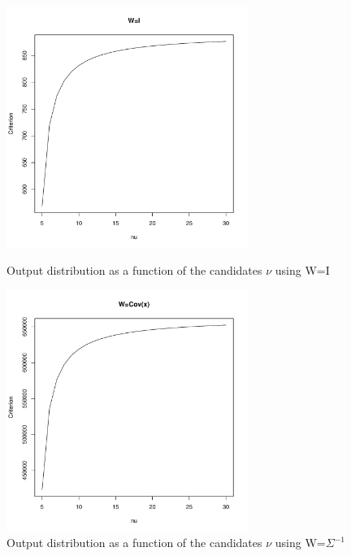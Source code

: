 \newpage

\begin{figure}\label{t-returns_criterion}
    \centering
    \includegraphics[width=0.7\textwidth]{S&P500_returns_criterion_(W=I).pdf}
    \caption{Output distribution as a function of the candidates $\nu$ using W=I}
    \includegraphics[width=0.7\textwidth]{S&P500_returns_criterion_(W=Sigma^-1).pdf}
    \caption{Output distribution as a function of the candidates $\nu$ using W=$\Sigma^{-1}$}
\end{figure}